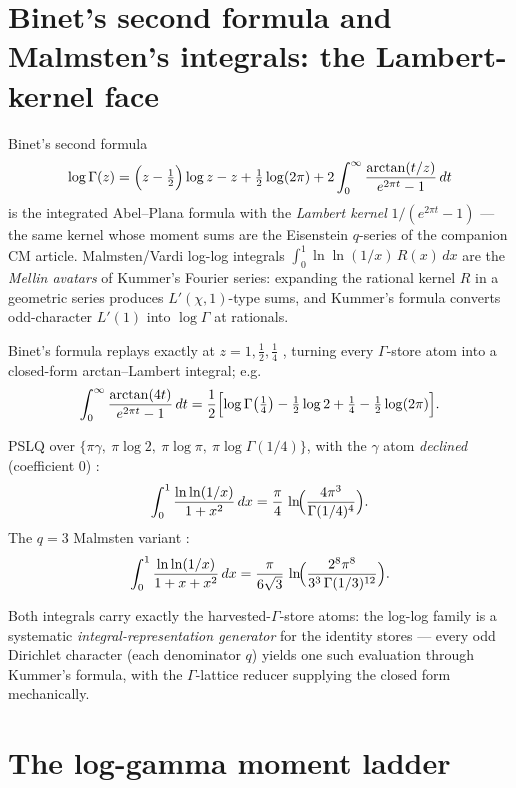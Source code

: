 \section{Binet's second formula and Malmsten's integrals: the Lambert-kernel face}
\label{integral:sec:binet}

Binet's second formula
\[
\log\Gamma(z)=\Bigl(z-\tfrac12\Bigr)\log z-z+\tfrac12\log(2\pi)
+2\int_0^\infty\frac{\arctan(t/z)}{e^{2\pi t}-1}\,dt
\]
is the integrated Abel--Plana formula with the \emph{Lambert kernel} $1/(e^{2\pi t}-1)$ ---
the same kernel whose moment sums are the Eisenstein $q$-series of the companion CM
article. Malmsten/Vardi log-log integrals $\int_0^1\ln\ln(1/x)\,R(x)\,dx$ are the
\emph{Mellin avatars} of Kummer's Fourier series: expanding the rational kernel $R$ in a
geometric series produces $L'(\chi,1)$-type sums, and Kummer's formula converts
odd-character $L'(1)$ into $\log\Gamma$ at rationals.

\begin{result}\label{integral:res:binet}
Binet's formula replays exactly at $z=1,\tfrac12,\tfrac14$ ,
turning every $\Gamma$-store atom into a closed-form arctan--Lambert integral; e.g.
\[
\int_0^\infty\frac{\arctan(4t)}{e^{2\pi t}-1}\,dt
=\frac{1}{2}\Bigl[\log\Gamma\bigl(\tfrac14\bigr)-\tfrac12\log2+\tfrac14
-\tfrac12\log(2\pi)\Bigr].
\]
\end{result}

\begin{result}\label{integral:res:vardi}
PSLQ over $\{\pi\gamma,\ \pi\log2,\ \pi\log\pi,\ \pi\log\Gamma(1/4)\}$, with the $\gamma$
atom \emph{declined} (coefficient $0$) :
\[
\int_0^1\frac{\ln\ln(1/x)}{1+x^2}\,dx=\frac{\pi}{4}\,
\ln\!\Bigl(\frac{4\pi^3}{\Gamma(1/4)^4}\Bigr).
\]
The $q=3$ Malmsten variant :
\[
\int_0^1\frac{\ln\ln(1/x)}{1+x+x^2}\,dx
=\frac{\pi}{6\sqrt3}\,\ln\!\Bigl(\frac{2^8\pi^8}{3^3\,\Gamma(1/3)^{12}}\Bigr).
\]
\end{result}

Both integrals carry exactly the harvested-$\Gamma$-store atoms: the log-log family is a
systematic \emph{integral-representation generator} for the identity stores --- every odd
Dirichlet character (each denominator $q$) yields one such evaluation through Kummer's
formula, with the $\Gamma$-lattice reducer supplying the closed form mechanically.

\section{The log-gamma moment ladder}\label{integral:sec:moments}

